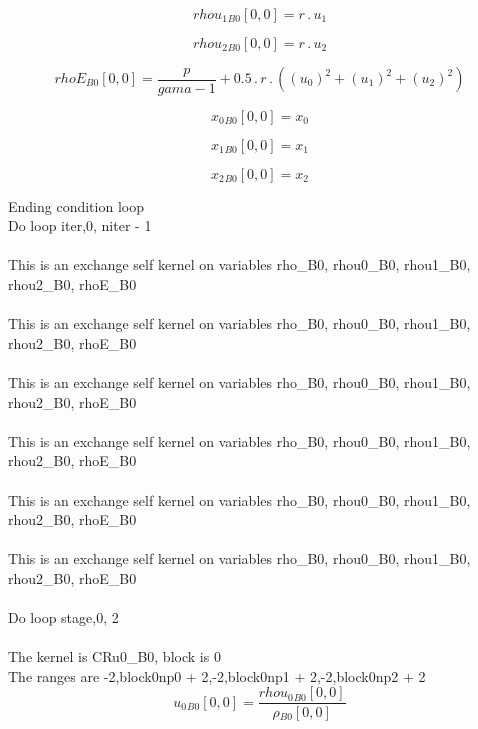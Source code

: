 \documentclass{article}
\begin{document}
\begin{dmath}{rhou_{1}{_{B0}}}[{0,0}] = r \,.\, u_{1}\end{dmath}

\begin{dmath}{rhou_{2}{_{B0}}}[{0,0}] = r \,.\, u_{2}\end{dmath}

\begin{dmath}{rhoE{_{B0}}}[{0,0}] = \frac{p}{gama - 1} + 0.5 \,.\, r \,.\, \left(\left(u_{0} \right)^{2} + \left(u_{1} \right)^{2} + \left(u_{2} \right)^{2}\right)\end{dmath}

\begin{dmath}{x_{0}{_{B0}}}[{0,0}] = x_{0}\end{dmath}

\begin{dmath}{x_{1}{_{B0}}}[{0,0}] = x_{1}\end{dmath}

\begin{dmath}{x_{2}{_{B0}}}[{0,0}] = x_{2}\end{dmath}

\noindent Ending condition loop %
\\\noindent Do loop iter,0, niter - 1\\
\\\noindent This is an exchange self kernel on variables rho_B0, rhou0_B0, rhou1_B0, rhou2_B0, rhoE_B0\\\\\noindent This is an exchange self kernel on variables rho_B0, rhou0_B0, rhou1_B0, rhou2_B0, rhoE_B0\\\\\noindent This is an exchange self kernel on variables rho_B0, rhou0_B0, rhou1_B0, rhou2_B0, rhoE_B0\\\\\noindent This is an exchange self kernel on variables rho_B0, rhou0_B0, rhou1_B0, rhou2_B0, rhoE_B0\\\\\noindent This is an exchange self kernel on variables rho_B0, rhou0_B0, rhou1_B0, rhou2_B0, rhoE_B0\\\\\noindent This is an exchange self kernel on variables rho_B0, rhou0_B0, rhou1_B0, rhou2_B0, rhoE_B0\\\\\noindent Do loop stage,0, 2\\
\\\noindent The kernel is CRu0_B0, block is 0\\\noindent The ranges are -2,block0np0 + 2,-2,block0np1 + 2,-2,block0np2 + 2\\\begin{dmath}{u_{0}{_{B0}}}[{0,0}] = \frac{{rhou_{0}{_{B0}}}[{0,0}]}{{\rho{_{B0}}}[{0,0}]}\end{dmath}
\end{document}
